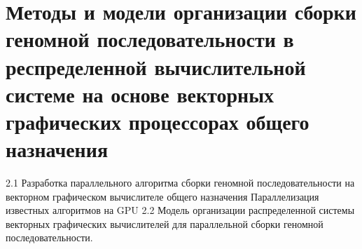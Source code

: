 \chapter{Методы и модели организации сборки геномной последовательности в респределенной вычислительной системе на основе векторных графических процессорах общего назначения}
    2.1 Разработка параллельного алгоритма сборки геномной последовательности на векторном графическом вычислителе общего назначения
	Параллелизация известных алгоритмов на GPU
	2.2 Модель организации распределенной системы векторных графических вычислителей для параллельной сборки геномной последовательности.